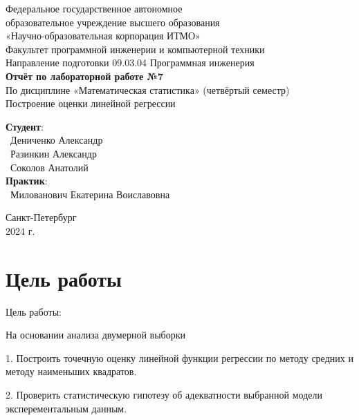 \documentclass{article}
\begin{document}
\begin{center}
    \Large
    Федеральное государственное автономное \\
    образовательное учреждение высшего образования \\ 
    «Научно-образовательная корпорация ИТМО»\\
    \vspace{0.5cm}
    \large
    Факультет программной инженерии и компьютерной техники \\
    Направление подготовки 09.03.04 Программная инженерия \\
    \vspace{1cm}
    \Large
    \textbf{Отчёт по лабораторной работе №7} \\
    По дисциплине «Математическая статистика» (четвёртый семестр)\\
    Построение оценки линейной регрессии\\
    \large
    \vspace{8cm}

    \begin{minipage}{.33\textwidth}
    \end{minipage}
    \hfill
    \begin{minipage}{.4\textwidth}
    
        \textbf{Студент}: \vspace{.1cm} \\
        \ Дениченко Александр\\
        \ Разинкин Александр\\
        \ Соколов Анатолий\\
        \textbf{Практик}:  \\
        \ Милованович Екатерина Воиславовна
    \end{minipage}
    \vfill
Санкт-Петербург\\ 2024 г.
\end{center}
\thispagestyle{empty}

\newpage
\section*{Цель работы}
Цель работы:

На основании анализа двумерной выборки

1. Построить точечную оценку линейной функции регрессии по методу средних и методу наименьших квадратов.

2. Проверить статистическую гипотезу об адекватности выбранной модели эксперементальным данным.
\end{document}
